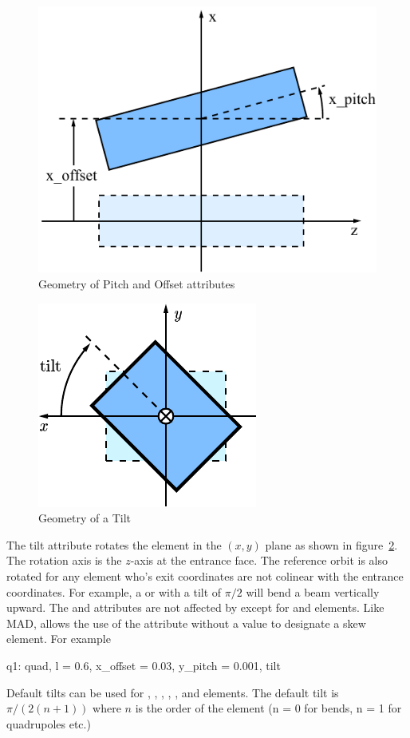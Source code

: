 \begin{figure}[t]
  \centering
  \includegraphics{pitch.pdf}
  \caption{Geometry of Pitch and Offset attributes}
  \label{f:pitch}
\end{figure}

\begin{figure}[t]
  \centering
  \includegraphics{tilt.pdf}
  \caption{Geometry of a Tilt}
  \label{f:tilt}
\end{figure}

The tilt attribute rotates the element in the $(x, y)$ plane as shown
in figure~\ref{f:tilt}. The rotation axis is the $z$-axis at the
entrance face. The reference orbit is also rotated for any element
who's exit coordinates are not colinear with the entrance
coordinates. For example, a  or  with a tilt of
$\pi/2$ will bend a beam vertically upward. The  and
 attributes are not affected by  except for
 and  elements. Like MAD, \bmad allows the
use of the  attribute without a value to designate a skew
element. For example
\begin{example}
  q1: quad, l = 0.6, x_offset = 0.03, y_pitch = 0.001, tilt
\end{example}
Default tilts can be used for , , ,
, , and  elements.
The default tilt is $\pi/(2(n+1))$ where $n$ is the order of the 
element (n = 0 for bends, n = 1 for quadrupoles etc.) 

